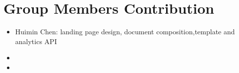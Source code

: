 \section{Group Members Contribution}

\begin{itemize}
    \item Huimin Chen: landing page design, document composition,template and analytics API
    \item 
    \item 
\end{itemize}